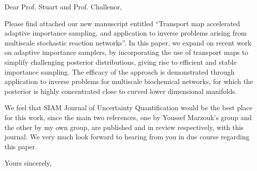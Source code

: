 \documentclass{letter}
\begin{document}
\date{}
\begin{letter}{ }

\opening{Dear Prof. Stuart and Prof. Challenor,}

Please find attached our new manuscript entitled ``Transport map accelerated adaptive importance sampling, and application to inverse problems arising from
  multiscale stochastic reaction networks''. In this paper, we expand
  on recent work on adaptive importance samplers, by incorporating the
  use of transport maps to simplify challenging posterior
  distributions, giving rise to efficient and stable importance
  sampling. The efficacy of the approach is demonstrated through
  application to inverse problems for multiscale biochemical networks,
  for which the posterior is highly concentrated close to curved lower
  dimensional manifolds. 

We feel that SIAM Journal of Uncertainty
  Quantification would be the best place for this work, since the main
  two references, one by Youssef Marzouk's group and the other by my
  own group, are published and in review respectively, with this journal.
We very much look forward to hearing from you in due course regarding this paper.

\closing{Yours sincerely,}
\end{letter}
\end{document}
